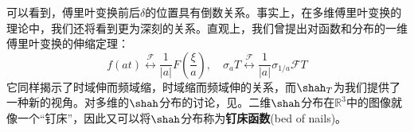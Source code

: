 可以看到，傅里叶变换前后$\delta$的位置具有倒数关系。事实上，在多维傅里叶变换的理论中，我们还将看到更为深刻的关系。直观上，我们曾提出对函数和分布的一维傅里叶变换的伸缩定理：
\[f(at)\overset{\mathcal{F} }{\longleftrightarrow}\frac{1}{|a|}F\left(\frac{\xi}{a}\right),\quad \sigma_a T\overset{\mathcal{F} }{\longleftrightarrow}\frac{1}{|a|}\sigma_{1/a}\mathcal{F} T\]
它同样揭示了时域伸而频域缩，时域缩而频域伸的关系，而$\shah_T$为我们提供了一种新的视角。对多维的$\shah$分布的讨论，见。二维$\shah$分布在$\mathbb{R}^3$中的图像就像一个“钉床”，因此又可以将$\shah$分布称为\textbf{钉床函数}(bed of nails)。
